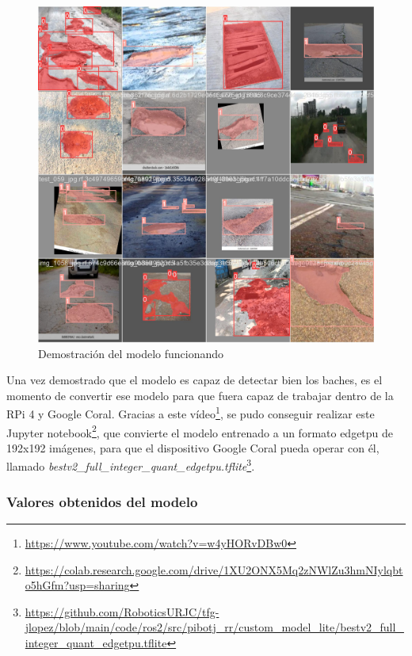  \begin{figure} [h!]
	\begin{center}
		\includegraphics[width=15cm]{figs/cap6/train_results.jpg}
	\end{center}
	\caption{Demostración del modelo funcionando}
	\label{fig:trainex}
\end{figure}

Una vez demostrado que el modelo es capaz de detectar bien los baches, es el momento de convertir ese modelo para que fuera capaz de trabajar dentro de la RPi 4 y Google Coral. Gracias a este vídeo\footnote{\url{https://www.youtube.com/watch?v=w4yHORvDBw0}}, se pudo conseguir realizar este Jupyter notebook\footnote{\url{https://colab.research.google.com/drive/1XU2ONX5Mq2zNWlZu3hmNIylqbto5hGfm?usp=sharing}}, que convierte el modelo entrenado a un formato edgetpu de 192x192 imágenes, para que el dispositivo Google Coral pueda operar con él, llamado \textit{bestv2\_full\_integer\_quant\_edgetpu.tflite}\footnote{\url{https://github.com/RoboticsURJC/tfg-jlopez/blob/main/code/ros2/src/pibotj_rr/custom_model_lite/bestv2_full_integer_quant_edgetpu.tflite}}.

\subsubsection{Valores obtenidos del modelo}
\label{subsec:valoresmodelotflite}

